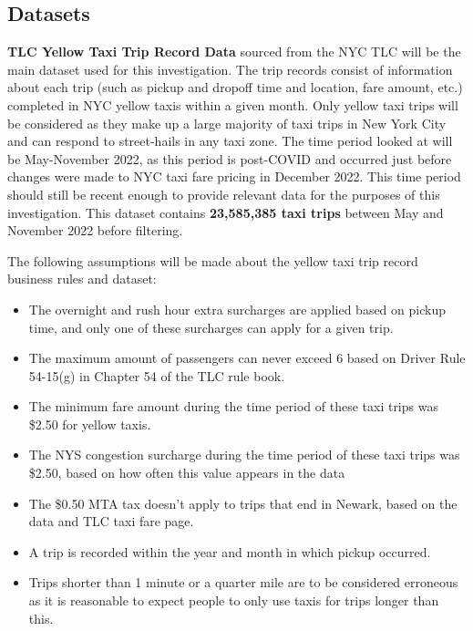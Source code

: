 \documentclass[11pt]{article}
\begin{document}
\subsection{Datasets}
\textbf{TLC Yellow Taxi Trip Record Data} sourced from the NYC TLC \cite{taxidata} will be the main dataset used for this investigation. The trip records consist of information about each trip (such as pickup and dropoff time and location, fare amount, etc.) completed in NYC yellow taxis within a given month. Only yellow taxi trips will be considered as they make up a large majority of taxi trips in New York City and can respond to street-hails in any taxi zone. The time period looked at will be May-November 2022, as this period is post-COVID and occurred just before changes were made to NYC taxi fare pricing in December 2022. This time period should still be recent enough to provide relevant data for the purposes of this investigation. This dataset contains \textbf{23,585,385 taxi trips} between May and November 2022 before filtering.

\newpage

The following assumptions will be made about the yellow taxi trip record business rules \cite{taxidatadict} and dataset:

\begin{itemize} 
    \item The overnight and rush hour extra surcharges are applied based on pickup time, and only one of these surcharges can apply for a given trip. 
    \item The maximum amount of passengers can never exceed 6 based on Driver Rule 54-15(g) in Chapter 54 of the TLC rule book. \cite{passengerlaw}
    \item The minimum fare amount during the time period of these taxi trips was \$2.50 for yellow taxis. \cite{oldfare}
    \item The NYS congestion surcharge during the time period of these taxi trips was \$2.50, based on how often this value appears in the data
    \item The \$0.50 MTA tax doesn't apply to trips that end in Newark, based on the data and TLC taxi fare page. \cite{taxifarepage}
    \item A trip is recorded within the year and month in which pickup occurred.
    \item Trips shorter than 1 minute or a quarter mile \cite{walkingdistance} are to be considered erroneous as it is reasonable to expect people to only use taxis for trips longer than this.
\end{itemize} 
\end{document}

